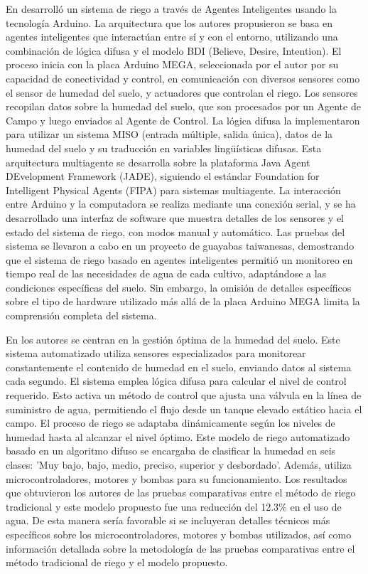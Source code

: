 \bigbreak
En \cite{salazar_irrigation_2013} desarrolló un sistema de riego a través de Agentes Inteligentes usando la tecnología Arduino. La arquitectura que los autores propusieron se basa en agentes inteligentes que interactúan entre sí y con el entorno, utilizando una combinación de lógica difusa y el modelo BDI (Believe, Desire, Intention). El proceso inicia con la placa Arduino MEGA, seleccionada por el autor por su capacidad de conectividad y control, en comunicación con diversos sensores como el sensor de humedad del suelo, y actuadores que controlan el riego. Los sensores recopilan datos sobre la humedad del suelo, que son procesados por un Agente de Campo y luego enviados al Agente de Control. La lógica difusa la implementaron para utilizar un sistema MISO (entrada múltiple, salida única), datos de la humedad del suelo y su traducción en variables lingüísticas difusas. Esta arquitectura multiagente se desarrolla sobre la plataforma Java Agent DEvelopment Framework (JADE), siguiendo el estándar Foundation for Intelligent Physical Agents (FIPA) para sistemas multiagente. La interacción entre Arduino y la computadora se realiza mediante una conexión serial, y se ha desarrollado una interfaz de software que muestra detalles de los sensores y el estado del sistema de riego, con modos manual y automático. Las pruebas del sistema se llevaron a cabo en un proyecto de guayabas taiwanesas, demostrando que el sistema de riego basado en agentes inteligentes permitió un monitoreo en tiempo real de las necesidades de agua de cada cultivo, adaptándose a las condiciones específicas del suelo. Sin embargo, la omisión de detalles específicos sobre el tipo de hardware utilizado más allá de la placa Arduino MEGA limita la comprensión completa del sistema.

\bigbreak
En \cite{hasan_implementation_2018} los autores se centran en la gestión óptima de la humedad del suelo. Este sistema automatizado utiliza sensores especializados para monitorear constantemente el contenido de humedad en el suelo, enviando datos al sistema cada segundo. El sistema emplea lógica difusa para calcular el nivel de control requerido. Esto activa un método de control que ajusta una válvula en la línea de suministro de agua, permitiendo el flujo desde un tanque elevado estático hacia el campo. El proceso de riego se adaptaba dinámicamente según los niveles de humedad hasta al alcanzar el nivel óptimo. Este modelo de riego automatizado basado en un algoritmo difuso se encargaba de clasificar la humedad en seis clases: 'Muy bajo, bajo, medio, preciso, superior y desbordado'. Además, utiliza microcontroladores, motores y bombas para su funcionamiento. Los resultados que obtuvieron los autores de las pruebas comparativas entre el método de riego tradicional y este modelo propuesto fue una reducción del 12.3\% en el uso de agua. De esta manera sería favorable si se incluyeran detalles técnicos más específicos sobre los microcontroladores, motores y bombas utilizados, así como información detallada sobre la metodología de las pruebas comparativas entre el método tradicional de riego y el modelo propuesto.

